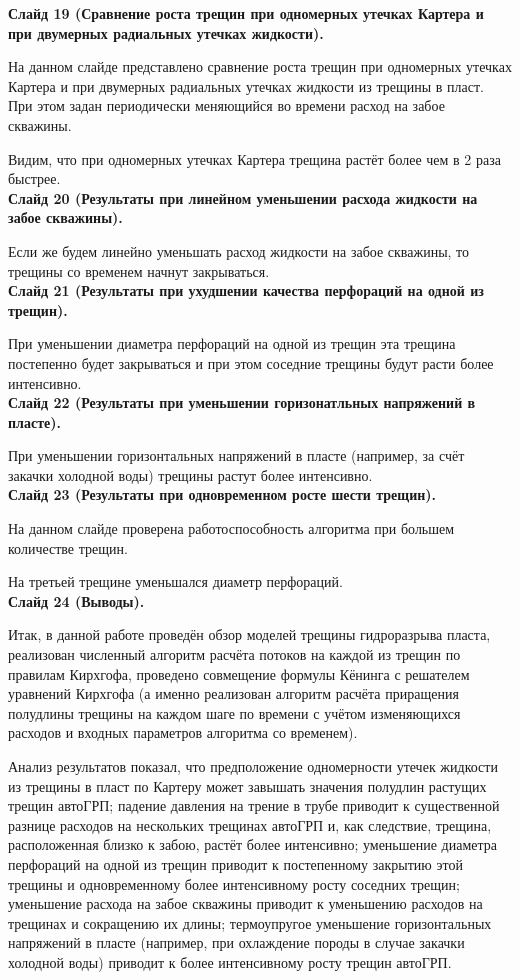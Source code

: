 \documentclass[a4paper, 12pt]{article}
\begin{document}
\textbf{Слайд 19 (Сравнение роста трещин при одномерных утечках Картера и при двумерных радиальных утечках жидкости).}

На данном слайде представлено сравнение роста трещин при одномерных утечках Картера и при двумерных радиальных утечках жидкости из трещины в пласт.
При этом задан периодически меняющийся во времени расход на забое скважины.

Видим, что при одномерных утечках Картера трещина растёт более чем в 2 раза быстрее.
\\


\textbf{Слайд 20 (Результаты при линейном уменьшении расхода жидкости на забое скважины).}

Если же будем линейно уменьшать расход жидкости на забое скважины, то трещины со временем начнут закрываться.
\\


\textbf{Слайд 21 (Результаты при ухудшении качества перфораций на одной из трещин).}

При уменьшении диаметра перфораций на одной из трещин эта трещина постепенно будет закрываться и при этом соседние трещины будут расти более интенсивно.
\\


\textbf{Слайд 22 (Результаты при уменьшении горизонатльных напряжений в пласте).}

При уменьшении горизонтальных напряжений в пласте (например, за счёт закачки холодной воды) трещины растут более интенсивно.
\\


\textbf{Слайд 23 (Результаты при одновременном росте шести трещин).}

На данном слайде проверена работоспособность алгоритма при большем количестве трещин.

На третьей трещине уменьшался диаметр перфораций.
\\


\textbf{Слайд 24 (Выводы).}

Итак, в данной работе проведён обзор моделей трещины гидроразрыва пласта, реализован численный алгоритм расчёта потоков на каждой из трещин по правилам Кирхгофа, проведено совмещение формулы Кёнинга с решателем уравнений Кирхгофа (а именно реализован алгоритм расчёта приращения полудлины трещины на каждом шаге по времени с учётом изменяющихся расходов и входных параметров алгоритма со временем).

Анализ результатов показал, что предположение одномерности утечек жидкости из трещины в пласт по Картеру может завышать значения полудлин растущих трещин автоГРП; падение давления на трение в трубе приводит к существенной разнице расходов на нескольких трещинах автоГРП и, как следствие, трещина, расположенная близко к забою, растёт более интенсивно; уменьшение диаметра перфораций на одной из трещин приводит к постепенному закрытию этой трещины и одновременному более интенсивному росту соседних трещин; уменьшение расхода на забое скважины приводит к уменьшению расходов на трещинах и сокращению их длины; термоупругое уменьшение горизонтальных напряжений в пласте (например, при охлаждение породы в случае закачки холодной воды) приводит к более интенсивному росту трещин автоГРП.
\end{document}
